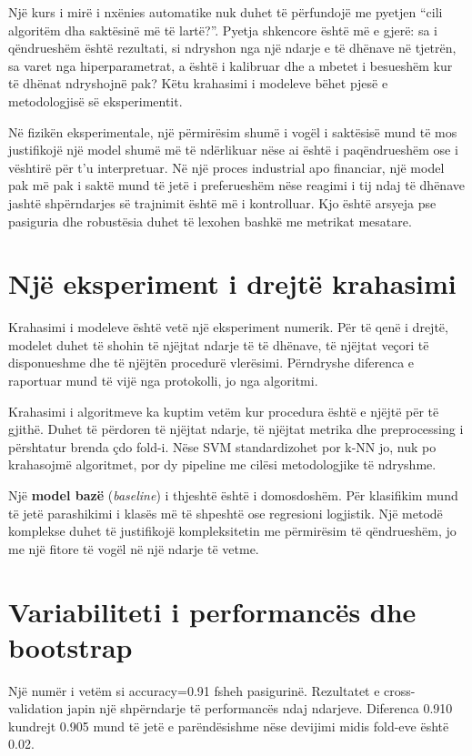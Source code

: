 \documentclass[12pt,a4paper,oneside]{book}
\newcommand{\term}[2]{\textbf{#1} (\textit{#2})}
\begin{document}
Një kurs i mirë i nxënies automatike nuk duhet të përfundojë me pyetjen ``cili algoritëm dha saktësinë më të lartë?''. Pyetja shkencore është më e gjerë: sa i qëndrueshëm është rezultati, si ndryshon nga një ndarje e të dhënave në tjetrën, sa varet nga hiperparametrat, a është i kalibruar dhe a mbetet i besueshëm kur të dhënat ndryshojnë pak? Këtu krahasimi i modeleve bëhet pjesë e metodologjisë së eksperimentit.

Në fizikën eksperimentale, një përmirësim shumë i vogël i saktësisë mund të mos justifikojë një model shumë më të ndërlikuar nëse ai është i paqëndrueshëm ose i vështirë për t'u interpretuar. Në një proces industrial apo financiar, një model pak më pak i saktë mund të jetë i preferueshëm nëse reagimi i tij ndaj të dhënave jashtë shpërndarjes së trajnimit është më i kontrolluar. Kjo është arsyeja pse pasiguria dhe robustësia duhet të lexohen bashkë me metrikat mesatare.
\section{Një eksperiment i drejtë krahasimi}

Krahasimi i modeleve është vetë një eksperiment numerik. Për të qenë i drejtë, modelet duhet të shohin të njëjtat ndarje të të dhënave, të njëjtat veçori të disponueshme dhe të njëjtën procedurë vlerësimi. Përndryshe diferenca e raportuar mund të vijë nga protokolli, jo nga algoritmi.

Krahasimi i algoritmeve ka kuptim vetëm kur procedura është e njëjtë për të gjithë. Duhet të përdoren të njëjtat ndarje, të njëjtat metrika dhe preprocessing i përshtatur brenda çdo fold-i. Nëse SVM standardizohet por k-NN jo, nuk po krahasojmë algoritmet, por dy pipeline me cilësi metodologjike të ndryshme.

Një \term{model bazë}{baseline} i thjeshtë është i domosdoshëm. Për klasifikim mund të jetë parashikimi i klasës më të shpeshtë ose regresioni logjistik. Një metodë komplekse duhet të justifikojë kompleksitetin me përmirësim të qëndrueshëm, jo me një fitore të vogël në një ndarje të vetme.

\section{Variabiliteti i performancës dhe bootstrap}

Një numër i vetëm si accuracy=0.91 fsheh pasigurinë. Rezultatet e cross-validation japin një shpërndarje të performancës ndaj ndarjeve. Diferenca 0.910 kundrejt 0.905 mund të jetë e parëndësishme nëse devijimi midis fold-eve është 0.02.
\end{document}
